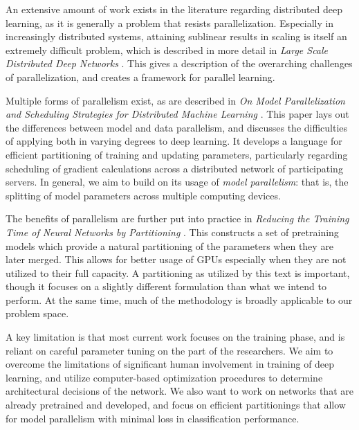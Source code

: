 \documentclass[11pt]{article}
\begin{document}
An extensive amount of work exists in the literature regarding distributed deep learning, as it is generally a problem that resists parallelization.
Especially in increasingly distributed systems, attaining sublinear results in scaling is itself an extremely difficult problem, which is described in more detail in \emph{Large Scale Distributed Deep Networks} \cite{dean2012large}.
This gives a description of the overarching challenges of parallelization, and creates a framework for parallel learning.

Multiple forms of parallelism exist, as are described in \emph{On Model Parallelization and Scheduling Strategies for Distributed Machine Learning} \cite{lee2014model}.
This paper lays out the differences between model and data parallelism, and discusses the difficulties of applying both in varying degrees to deep learning.
It develops a language for efficient partitioning of training and updating parameters, particularly regarding scheduling of gradient calculations across a distributed network of participating servers.
In general, we aim to build on its usage of \emph{model parallelism}: that is, the splitting of model parameters across multiple computing devices.

The benefits of parallelism are further put into practice in \emph{Reducing the Training Time of Neural Networks by Partitioning} \cite{miranda2015reducing}.
This constructs a set of pretraining models which provide a natural partitioning of the parameters when they are later merged.
This allows for better usage of GPUs especially when they are not utilized to their full capacity.
A partitioning as utilized by this text is important, though it focuses on a slightly different formulation than what we intend to perform.
At the same time, much of the methodology is broadly applicable to our problem space.

A key limitation is that most current work focuses on the training phase, and is reliant on careful parameter tuning on the part of the researchers.
We aim to overcome the limitations of significant human involvement in training of deep learning, and utilize computer-based optimization procedures to determine architectural decisions of the network.
We also want to work on networks that are already pretrained and developed, and focus on efficient partitionings that allow for model parallelism with minimal loss in classification performance.

\end{document}
